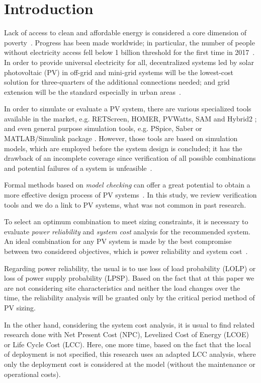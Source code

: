 \documentclass[10pt,conference]{IEEEtran}
\begin{document}
\section{Introduction}
Lack of access to clean and affordable energy is considered a core dimension of poverty~\cite{Hussein2012}. Progress has been made worldwide; in particular, the number of people without electricity access fell below 1 billion threshold for the first time in 2017~\cite{IEAweo2018}. In order to provide universal electricity for all, decentralized systems led by solar photovoltaic (PV) in off-grid and mini-grid systems will be the lowest-cost solution for three-quarters of the additional connections needed; and grid extension will be the standard especially in urban areas~\cite{IEAweo2018}.

In order to simulate or evaluate a PV system, there are various specialized tools available in the market, e.g. RETScreen, HOMER, PVWatts, SAM and Hybrid2 \cite{Pradhan,Swarnkar,NRELDobos,NRELBlair,Mills}; and even general purpose simulation tools, e.g. PSpice, Saber or MATLAB/Simulink package \cite{Gow1999,Benatiallah2017}. However, those tools are based on simulation models, which are employed before the system design is concluded; it has the drawback of an incomplete coverage since verification of all possible combinations and potential failures of a system is unfeasible~\cite{ClarkeHV18}.

Formal methods based on \textit{model checking} can offer a great potential to obtain a more effective design process of PV systems~\cite{ClarkeHV18}. In this study, we review verification tools and we do a link to PV systems, what was not common in past research. 

To select an optimum combination to meet sizing constraints, it is necessary to evaluate \textit{power reliability} and \textit{system cost} analysis for the recommended system. An ideal combination for any PV system is made by the best compromise between two considered objectives, which is power reliability and system cost~\cite{Alsadi2018}. 

Regarding power reliability, the usual is to use loss of load probability (LOLP) or loss of power supply probability (LPSP). Based on the fact that at this paper we are not considering site characteristics and neither the load changes over the time, the reliability analysis will be granted only by the critical period method of PV sizing. 

In the other hand, considering the system cost analysis, it is usual to find related research done with Net Present Cost (NPC), Levelized Cost of Energy (LCOE) or Life Cycle Cost (LCC). Here, one more time, based on the fact that the local of deployment is not specified, this research uses an adapted LCC analysis, where only the deployment cost is considered at the model (without the maintenance or operational costs).
\end{document}
